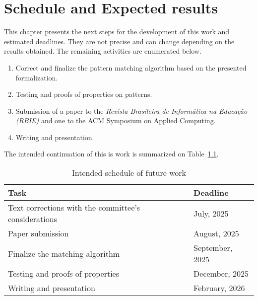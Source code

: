 \chapter{Schedule and Expected results}\label{chap:future-work}

This chapter presents the next steps for the development of this work and 
estimated deadlines. They are not precise and can change depending on the results
obtained. The remaining activities are enumerated below.

\begin{enumerate}
    \item Correct and finalize the pattern matching algorithm based on the 
        presented formalization.
    \item Testing and proofs of properties on patterns.
    \item Submission of a paper to the \textit{Revista Brasileira de Informática na Educação (RBIE)} 
        and one to the ACM Symposium on Applied Computing.
    \item Writing and presentation.
\end{enumerate}

The intended continuation of this is work is summarized on Table~\ref{table:schedule}.

\begin{table}[ht]
    \centering
    \caption{Intended schedule of future work}
    \label{table:schedule}
    \begin{tabular}{ll}
        \hline
        \textbf{Task} & \textbf{Deadline} \\
        \hline
        Text corrections with the committee's considerations & July, 2025 \\
        Paper submission & August, 2025 \\
        Finalize the matching algorithm & September, 2025 \\
        Testing and proofs of properties & December, 2025 \\
        Writing and presentation & February, 2026 \\
        \hline
    \end{tabular}
\end{table}